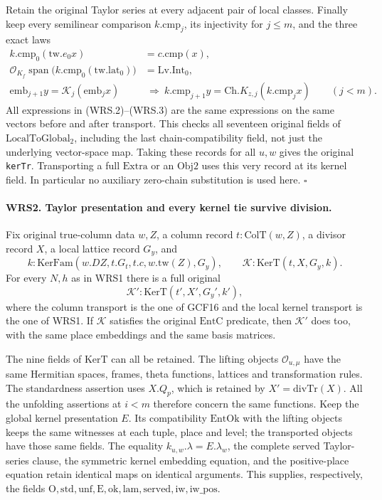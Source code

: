 Retain the original Taylor series at every adjacent pair of local
classes.  Finally keep every semilinear comparison \(k.\mathrm{cmp}_j\),
its injectivity for \(j\le m\), and the three exact laws
\[
 \begin{aligned}
 k.\mathrm{cmp}_0(\mathrm{tw}.e_0 x)&=c.\mathrm{cmp}(x),\\
 \mathcal O_{K_f}\operatorname{span}
   \bigl(k.\mathrm{cmp}_0(\mathrm{tw}.\mathrm{lat}_0)\bigr)
     &=\mathrm{Lv.Int}_0,\\
 \mathrm{emb}_{j+1}y=\mathcal K_j(\mathrm{emb}_j x)
   &\ \Longrightarrow\
 k.\mathrm{cmp}_{j+1}y=\mathrm{Ch}.K_{z,j}(k.\mathrm{cmp}_j x)
       \qquad(j<m).
 \end{aligned}                                                    \tag{WRS.3}
\]
All expressions in (WRS.2)--(WRS.3) are the same expressions on the
same vectors before and after transport.  This checks all seventeen
original fields of \(\mathrm{LocalToGlobal}_2\), including the last
chain-compatibility field, not just the underlying vector-space map.
Taking these records for all \(u,w\) gives the original
\texttt{kerTr}.  Transporting a full \(\mathrm{Extra}\) or an
\(\mathrm{Obj2}\) uses this very record at its kernel field.
In particular no auxiliary zero-chain substitution is used here.
\hfill\(\square\)

\paragraph{WRS2. Taylor presentation and every kernel tie survive division.}
\label{claim:WRS2}
Fix original true-column data \(w,Z\), a column record
\(t:\mathrm{ColT}(w,Z)\), a divisor record \(X\), a local lattice
record \(G_y\), and
\[
 k:\mathrm{KerFam}(w.DZ,t.G_t,t.c,w.\mathrm{tw}(Z),G_y),\qquad
 \mathcal K:\mathrm{KerT}(t,X,G_y,k).
\]
For every \(N,h\) as in WRS1 there is a full original
\[
 \mathcal K':\mathrm{KerT}
       (t',X',G_y',k'),                              \tag{WRS.4}
\]
where the column transport is the one of GCF16 and the local kernel
transport is the one of WRS1.  If \(\mathcal K\) satisfies the
original \(\mathrm{EntC}\) predicate, then \(\mathcal K'\) does too,
with the same place embeddings and the same basis matrices.

The nine fields of \(\mathrm{KerT}\) can all be retained.  The
lifting objects \(\mathcal O_{u,\mu}\) have the same Hermitian
spaces, frames, theta functions, lattices and transformation rules.
The standardness assertion uses \(X.Q_p\), which is retained by
\(X'=\mathrm{divTr}(X)\).  All the unfolding assertions at
\(i<m\) therefore concern the same functions.  Keep the global
kernel presentation \(E\).  Its compatibility \(\mathrm{EntOk}\)
with the lifting objects keeps the same witnesses at each tuple,
place and level; the transported objects have those same fields.
The equality \(k_{u,w}.\lambda=E.\lambda_w\), the complete served
Taylor-series clause, the symmetric kernel embedding equation, and
the positive-place equation retain identical maps on identical
arguments.  This supplies, respectively, the fields
\(\mathrm{O},\mathrm{std},\mathrm{unf},\mathrm{E},\mathrm{ok},
\mathrm{lam},\mathrm{served},\mathrm{iw},\mathrm{iw\_pos}\).

